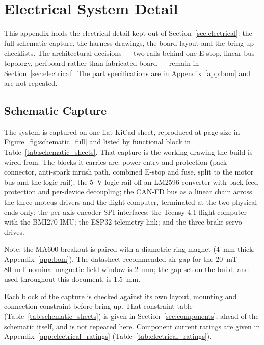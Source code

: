 \section{Electrical System Detail}
\label{app:electrical}

This appendix holds the electrical detail kept out of
Section~\ref{sec:electrical}: the full schematic capture, the harness drawings,
the board layout and the bring-up checklists. The architectural decisions --- two rails behind one E-stop, linear
bus topology, perfboard rather than fabricated board --- remain in
Section~\ref{sec:electrical}. The part specifications are in
Appendix~\ref{app:bom} and are not repeated.

\subsection{Schematic Capture}
\label{app:schematics}
\label{app:schematic_full}

The system is captured on one flat KiCad sheet, reproduced at page size in
Figure~\ref{fig:schematic_full} and listed by functional block in
Table~\ref{tab:schematic_sheets}. That capture is the working drawing the build
is wired from. The blocks it carries are: power entry and protection (pack
connector, anti-spark inrush path, combined E-stop and fuse, split to the motor
bus and the logic rail); the \qty{5}{\volt} logic rail off an LM2596 converter
with back-feed protection and per-device decoupling; the CAN-FD bus as a linear
chain across the three moteus drivers and the flight computer, terminated at
the two physical ends only; the per-axis encoder SPI interfaces; the Teensy 4.1
flight computer with the BMI270 IMU; the ESP32 telemetry link; and the three
brake servo drives.

Note: the MA600 breakout is paired with a diametric ring magnet
(\qty{4}{\milli\metre} thick; Appendix~\ref{app:bom}). The datasheet-recommended
air gap for the \qty{20}{\milli\tesla}--\qty{80}{\milli\tesla} nominal magnetic
field window is \qty{2}{\milli\metre}; the gap set on the build, and used
throughout this document, is \qty{1.5}{\milli\metre}.

Each block of the capture is checked against its own layout, mounting and
connection constraint before bring-up. That constraint table
(Table~\ref{tab:schematic_sheets}) is given in Section~\ref{sec:components},
ahead of the schematic itself, and is not repeated here. Component current
ratings are given in Appendix~\ref{app:electrical_ratings}
(Table~\ref{tab:electrical_ratings}).

